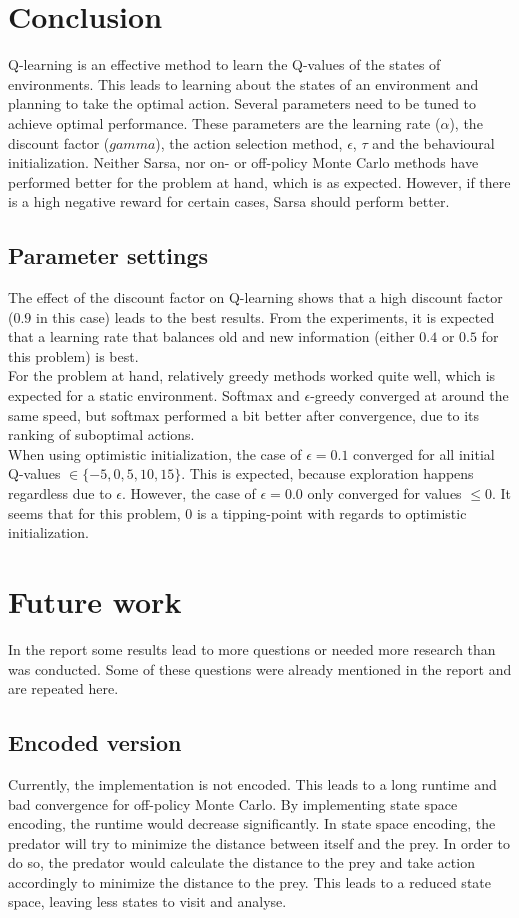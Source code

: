 \documentclass{article}
\begin{document}
\pagebreak
\section{Conclusion}
Q-learning is an effective method to learn the Q-values of the states of environments. This leads to learning about the states of an environment and planning to take the optimal action. Several parameters need to be tuned to achieve optimal performance. These parameters are the learning rate  ($\alpha$), the discount factor ($gamma$), the action selection method, $\epsilon$, $\tau$ and the behavioural initialization. Neither Sarsa, nor on- or off-policy Monte Carlo methods have performed better for the problem at hand, which is as expected. However, if there is a high negative reward for certain cases, Sarsa should perform better.
\subsection{Parameter settings}
The effect of the discount factor on Q-learning shows that a high discount factor ($0.9$ in this case) leads to the best results. From the experiments, it is expected that a learning rate that balances old and new information (either $0.4$ or $0.5$ for this problem) is best. \\
For the problem at hand, relatively greedy methods worked quite well, which is expected for a static environment. Softmax and $\epsilon$-greedy converged at around the same speed, but softmax performed a bit better after convergence, due to its ranking of suboptimal actions. \\
When using optimistic initialization, the case of $\epsilon=0.1$ converged for all initial Q-values $\in \{-5,0,5,10,15\}$. This is expected, because exploration happens regardless due to $\epsilon$. However, the case of $\epsilon=0.0$ only converged for values $\le 0$. It seems that for this problem, $0$ is a tipping-point with regards to optimistic initialization.

\pagebreak
\section{Future work}
In the report some results lead to more questions or needed more research than was conducted. Some of these questions were already mentioned in the report and are repeated here. 

\subsection{Encoded version}
Currently, the implementation is not encoded. This leads to a long runtime and bad convergence for off-policy Monte Carlo. By implementing state space encoding, the runtime would decrease significantly. In state space encoding, the predator will try to minimize the distance between itself and the prey. In order to do so, the predator would calculate the distance to the prey and take action accordingly to minimize the distance to the prey. This leads to a reduced state space, leaving less states to visit and analyse. 
\end{document}
